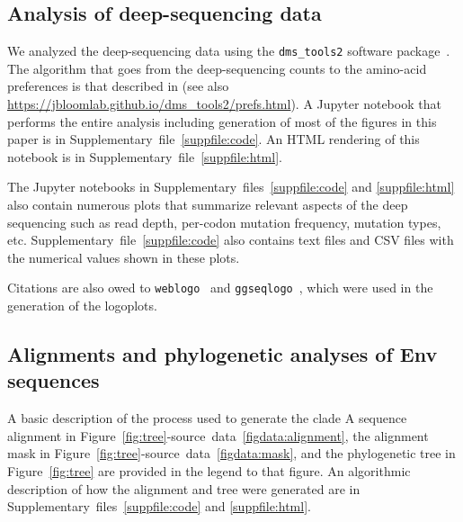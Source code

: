 \documentclass[9pt]{elife}
\begin{document}
\subsection{Analysis of deep-sequencing data}
We analyzed the deep-sequencing data using the \texttt{dms\_tools2} software package~\citep[\url{https://jbloomlab.github.io/dms_tools2/}]{bloom2015software}.
The algorithm that goes from the deep-sequencing counts to the amino-acid preferences is that described in \citet{bloom2015software} (see also \url{https://jbloomlab.github.io/dms_tools2/prefs.html}).
A Jupyter notebook that performs the entire analysis including generation of most of the figures in this paper is in Supplementary~file~\ref{suppfile:code}.
An HTML rendering of this notebook is in Supplementary~file~\ref{suppfile:html}.

The Jupyter notebooks in Supplementary~files~\ref{suppfile:code} and \ref{suppfile:html} also contain numerous plots that summarize relevant aspects of the deep sequencing such as read depth, per-codon mutation frequency, mutation types, etc.
Supplementary~file~\ref{suppfile:code} also contains text files and CSV files with the numerical values shown in these plots.

Citations are also owed to \texttt{weblogo}~\citep[][\url{http://weblogo.threeplusone.com/}]{crooks2004weblogo} and \texttt{ggseqlogo}~\citep[][\url{https://omarwagih.github.io/ggseqlogo/}]{wagih2017ggseqlogo}, which were used in the generation of the logoplots. 

\subsection{Alignments and phylogenetic analyses of Env sequences}
A basic description of the process used to generate the clade A sequence alignment in Figure~\ref{fig:tree}-source~data~\ref{figdata:alignment}, the alignment mask in Figure~\ref{fig:tree}-source~data~\ref{figdata:mask}, and the phylogenetic tree in Figure~\ref{fig:tree} are provided in the legend to that figure.
An algorithmic description of how the alignment and tree were generated are in Supplementary~files~\ref{suppfile:code} and \ref{suppfile:html}.
\end{document}
